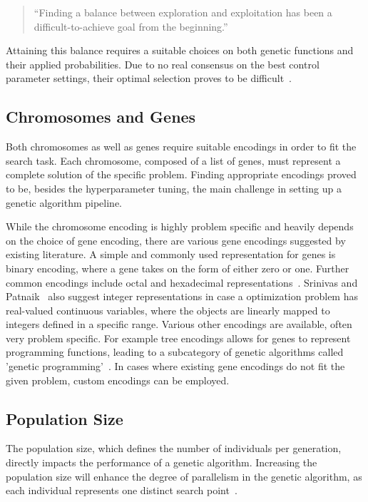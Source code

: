 \begin{quote}
	\begin{em}
		\enquote{Finding a balance between exploration and exploitation has been a difficult-to-achieve goal from the beginning.}~\cite{kacprzyk_parameter_2007}
	\end{em}
\end{quote}

Attaining this balance requires a suitable choices on both genetic functions and their applied probabilities. Due to no real consensus on the best control parameter settings, their optimal selection proves to be difficult~\cite{kacprzyk_parameter_2007}.

\subsection{Chromosomes and Genes}
\label{sect:foundations:chromosomes_and_genes}
Both chromosomes as well as genes require suitable encodings in order to fit the search task. Each chromosome, composed of a list of genes, must represent a complete solution of the specific problem. Finding appropriate encodings proved to be, besides the hyperparameter tuning, the main challenge in setting up a genetic algorithm pipeline.

While the chromosome encoding is highly problem specific and heavily depends on the choice of gene encoding, there are various gene encodings suggested by existing literature. A simple and commonly used representation for genes is binary encoding, where a gene takes on the form of either zero or one. Further common encodings include octal and hexadecimal representations~\cite{srinivas_genetic_1994,katoch_review_2021}. Srinivas and Patnaik~\cite{srinivas_genetic_1994} also suggest integer representations in case a optimization problem has real-valued continuous variables, where the objects are linearly mapped to integers defined in a specific range. Various other encodings are available, often very problem specific. For example tree encodings allows for genes to represent programming functions, leading to a subcategory of genetic algorithms called 'genetic programming'~\cite{katoch_review_2021}. In cases where existing gene encodings do not fit the given problem, custom encodings can be employed.

\subsection{Population Size}
The population size, which defines the number of individuals per generation, directly impacts the performance of a genetic algorithm. Increasing the population size will enhance the degree of parallelism in the genetic algorithm, as each individual represents one distinct search point~\cite{mills_determining_2015}.

